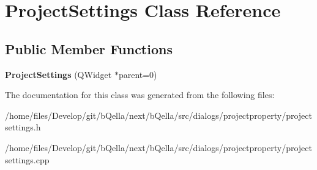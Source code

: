 \hypertarget{classProjectSettings}{
\section{ProjectSettings Class Reference}
\label{classProjectSettings}
}
\subsection*{Public Member Functions}
\begin{DoxyCompactItemize}
\item 
\hypertarget{classProjectSettings_a57857be3206ab4f4487eab3fef8a6414}{
{\bfseries ProjectSettings} (QWidget $\ast$parent=0)}
\label{classProjectSettings_a57857be3206ab4f4487eab3fef8a6414}

\end{DoxyCompactItemize}


The documentation for this class was generated from the following files:\begin{DoxyCompactItemize}
\item 
/home/files/Develop/git/bQella/next/bQella/src/dialogs/projectproperty/projectsettings.h\item 
/home/files/Develop/git/bQella/next/bQella/src/dialogs/projectproperty/projectsettings.cpp\end{DoxyCompactItemize}
